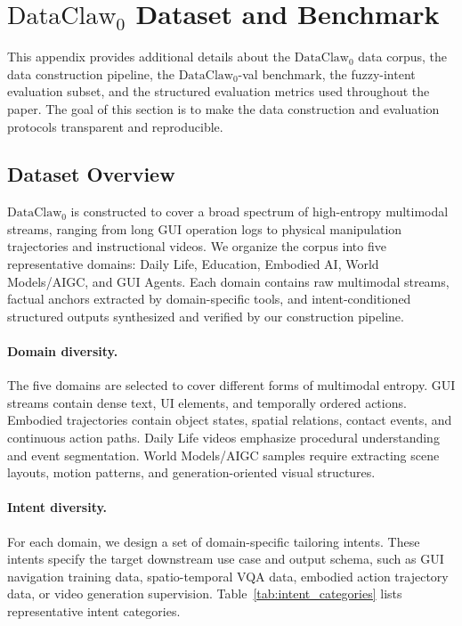 \appendix


\section{$\text{DataClaw}_0$ Dataset and Benchmark}
\label{app:dataset_benchmark}

This appendix provides additional details about the $\text{DataClaw}_0$ data corpus, the data construction pipeline, the $\text{DataClaw}_0$-val benchmark, the fuzzy-intent evaluation subset, and the structured evaluation metrics used throughout the paper. The goal of this section is to make the data construction and evaluation protocols transparent and reproducible.

\subsection{Dataset Overview}
\label{app:dataset_overview}

$\text{DataClaw}_0$ is constructed to cover a broad spectrum of high-entropy multimodal streams, ranging from long GUI operation logs to physical manipulation trajectories and instructional videos. We organize the corpus into five representative domains: Daily Life, Education, Embodied AI, World Models/AIGC, and GUI Agents. Each domain contains raw multimodal streams, factual anchors extracted by domain-specific tools, and intent-conditioned structured outputs synthesized and verified by our construction pipeline.


\paragraph{Domain diversity.}
The five domains are selected to cover different forms of multimodal entropy. GUI streams contain dense text, UI elements, and temporally ordered actions. Embodied trajectories contain object states, spatial relations, contact events, and continuous action paths. Daily Life videos emphasize procedural understanding and event segmentation. World Models/AIGC samples require extracting scene layouts, motion patterns, and generation-oriented visual structures.

\paragraph{Intent diversity.}
For each domain, we design a set of domain-specific tailoring intents. These intents specify the target downstream use case and output schema, such as GUI navigation training data, spatio-temporal VQA data, embodied action trajectory data, or video generation supervision. Table~\ref{tab:intent_categories} lists representative intent categories.

